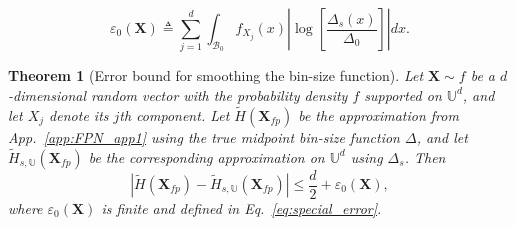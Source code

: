 \documentclass[10pt,a4paper]{amsart}
\newtheorem{theorem}{Theorem}
\newcommand{\abs}[1]{\left| #1 \right|}
\newcommand{\bracket}[1]{\left[ #1 \right]}
\begin{document}
\begin{equation}
\label{eq:special_error}
\varepsilon_{0}(\mathbf X)
\triangleq
\sum_{j=1}^{d}
\int_{\mathcal B_{0}}
f_{X_j}(x)
\left|
\log\bracket{\frac{\Delta_s(x)}{\Delta_0}}
\right|dx.
\end{equation}

\begin{theorem}[Error bound for smoothing the bin-size function]\label{thm:steps}
Let $\mathbf{X}\sim f$ be a $d$-dimensional random vector with the probability density $f$ supported on $\mathbb U^d$, and let $X_j$ denote its $j$th component. Let $\tilde H(\mathbf X_{fp})$ be the approximation from App.~\ref{app:FPN_app1} using the true midpoint bin-size function $\Delta$, and let $\tilde H_{s,\mathbb U}(\mathbf X_{fp})$ be the corresponding approximation on $\mathbb U^d$ using $\Delta_s$. Then
\begin{equation}
\abs{\tilde H(\mathbf X_{fp}) - \tilde H_{s,\mathbb U}(\mathbf X_{fp})} \leq \frac{d}{2} + \varepsilon_{0}(\mathbf X),
\end{equation}
where $\varepsilon_{0}(\mathbf X)$ is finite and defined in Eq.~\eqref{eq:special_error}.
\end{theorem}
\end{document}

